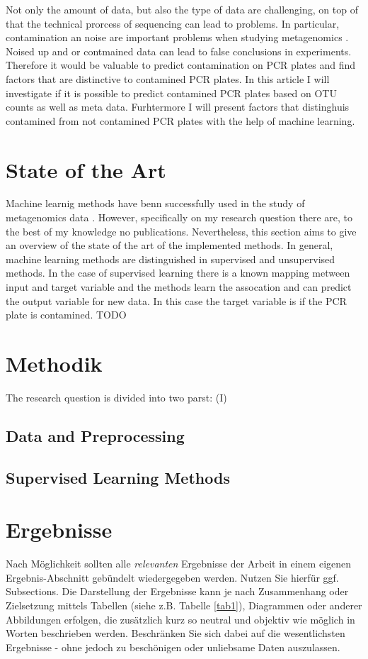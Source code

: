 \documentclass{svproc}
\begin{document}
Not only the amount of data, but also the type of data are challenging, on top of that the technical prorcess of sequencing can lead to problems.
In particular, contamination an noise are important problems when studying metagenomics \cite{paper Michel}. Noised up and or contmained data can lead to false conclusions in experiments. Therefore it would be valuable to predict contamination on PCR plates and find factors that are distinctive to contamined PCR plates. In this article I will investigate if it is possible to predict contamined PCR plates based on OTU counts as well as meta data. Furhtermore I will present factors that distinghuis contamined from not contamined PCR plates with the help of machine learning.


\section{State of the Art}
Machine learnig methods have benn successfully used in the study of metagenomics data  \cite{paperrunde}. However, specifically on my research question there are, to the best of my knowledge no publications. Nevertheless, this section aims to give an overview of the state of the art of the implemented methods. In general, machine learning methods are distinguished in supervised and unsupervised methods. In the case of supervised learning there is a known mapping metween input and target variable and the methods learn the assocation and can predict the output variable for new data. In this case the target variable is if the PCR plate is contamined.
TODO

 
%
%
\section{Methodik}
%
The research question is divided into two parst: (I)
\subsection{Data and Preprocessing}
\subsection{Supervised Learning Methods}
%
%
\section{Ergebnisse}
%
Nach Möglichkeit sollten alle \textit{relevanten} Ergebnisse der Arbeit in einem eigenen Ergebnis-Abschnitt gebündelt wiedergegeben werden. Nutzen Sie hierfür ggf. Subsections. Die Darstellung der Ergebnisse kann je nach Zusammenhang oder Zielsetzung mittels Tabellen (siehe z.B. Tabelle \ref{tab1}), Diagrammen oder anderer Abbildungen erfolgen, die zusätzlich kurz so neutral und objektiv wie möglich in Worten beschrieben werden. Beschränken Sie sich dabei auf die wesentlichsten Ergebnisse - ohne jedoch zu beschönigen oder unliebsame Daten auszulassen. 
\end{document}
